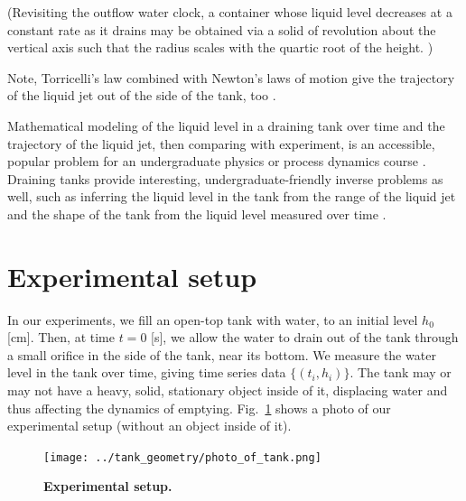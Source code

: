 \documentclass[openacc]{rsproca_new}%
\begin{document}
(Revisiting the outflow water clock, a container whose liquid level decreases at a constant rate as it drains may be obtained via a solid of revolution about the vertical axis such that the radius scales with the quartic root of the height. \cite{mills1982newton,d2021torricelli}) 

Note, Torricelli's law combined with Newton's laws of motion give the trajectory of the liquid jet out of the side of the tank, too \cite{groetsch1999inverse}.

Mathematical modeling of the liquid level in a draining tank over time and the trajectory of the liquid jet, then comparing with experiment, is an accessible, popular problem for an undergraduate physics or process dynamics course \cite{farmer1992physical,driver1998torricelli,brady2009siphons,rother2024modelling,paldy1963apparatus,ivanov2014testing,williams2021vessel,pavesi2019investigating,planinvsivc2011holes,saleta2005experimental,lopac2015water}. Draining tanks provide interesting, undergraduate-friendly inverse problems \cite{groetsch1993inverse,neto2012introduction,tarantola2005inverse} as well, such as inferring the liquid level in the tank from the range of the liquid jet and the shape of the tank from the liquid level measured over time \cite{groetsch1993inverse,groetsch1999inverse}.


\section{Experimental setup}
In our experiments, we fill an open-top tank with water, to an initial level $h_0$ [cm].
Then, at time $t=0$ [s], we allow the water to drain out of the tank through a small orifice in the side of the tank, near its bottom. We measure the water level in the tank over time, giving time series data $\{(t_i, h_i)\}$. The tank may or may not have a heavy, solid, stationary object inside of it, displacing water and thus affecting the dynamics of emptying. Fig.~\ref{fig:photo_of_tank} shows a photo of our experimental setup (without an object inside of it).

\begin{figure}[h!]
\begin{center}
	\texttt{[image: ../tank\_geometry/photo\_of\_tank.png]}
	\caption{\textbf{Experimental setup.}}
	\label{fig:photo_of_tank}
\end{center}
\end{figure}
\end{document}
